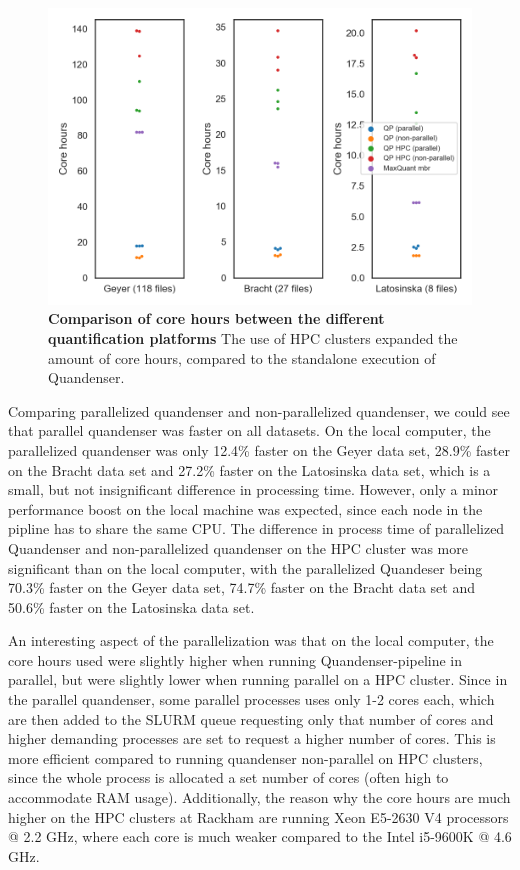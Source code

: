 \documentclass[11pt]{article}
\begin{document}
\begin{figure}[H]
  \includegraphics[width=\linewidth]{data/cores.png}
  \caption{\textbf{Comparison of core hours between the different quantification platforms}
 The use of HPC clusters expanded the amount of core hours, compared to the standalone execution of Quandenser.
  }
  \label{fig:corehours}
\end{figure}

Comparing parallelized quandenser and non-parallelized quandenser, we could see that parallel quandenser was faster on all datasets. On the local computer, the parallelized quandenser was only 12.4\% faster on the Geyer data set, 28.9\% faster on the Bracht data set and 27.2\% faster on the Latosinska data set, which is a small, but not insignificant difference in processing time. However, only a minor performance boost on the local machine was expected, since each node in the pipline has to share the same CPU. The difference in process time of parallelized Quandenser and non-parallelized quandenser on the HPC cluster was more significant than on the local computer, with the parallelized Quandeser being 70.3\% faster on the Geyer data set, 74.7\% faster on the Bracht data set and 50.6\% faster on the Latosinska data set.

An interesting aspect of the parallelization was that on the local computer, the core hours used were slightly higher when running Quandenser-pipeline in parallel, but were slightly lower when running parallel on a HPC cluster. Since in the parallel quandenser, some parallel processes uses only 1-2 cores each, which are then added to the SLURM queue requesting only that number of cores and higher demanding processes are set to request a higher number of cores. This is more efficient compared to running quandenser non-parallel on HPC clusters, since the whole process is allocated a set number of cores (often high to accommodate RAM usage). Additionally, the reason why the core hours are much higher on the HPC clusters at Rackham are running Xeon E5-2630 V4 processors @ 2.2 GHz, where each core is much weaker compared to the Intel i5-9600K @ 4.6 GHz.
\end{document}
